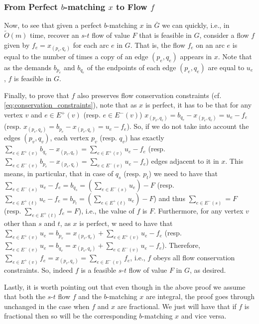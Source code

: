 \documentclass[11pt, letterpaper]{article}
\newcommand{\tO}[1]{\widetilde{O}(#1)}
\newcommand{\oG}{\bar{G}}
\newcommand{\bb}{\boldsymbol{\mathit{b}}}
\newcommand{\ff}{\boldsymbol{\mathit{f}}}
\newcommand{\xx}{\boldsymbol{\mathit{x}}}
\begin{document}
\subsubsection*{From Perfect $\bb$-matching $\xx$ to Flow $\ff$}

Now, to see that given a perfect $\bb$-matching $\xx$ in $\oG$ we can quickly, i.e., in $\tO{m}$ time, recover an $s$-$t$ flow of value $F$ that is feasible in $G$, consider a flow $\ff$ given by $f_e=x_{(p_e,q_e)}$ for each arc $e$ in $G$. That is, the flow $f_e$ on an arc $e$ is equal to the number of times a copy of an edge $(p_e,q_e)$ appears in $\xx$. Note that as the demands $b_{p_e}$ and $b_{q_e}$ of the endpoints of each edge $(p_e,q_e)$ are equal to $u_e$, $\ff$ is feasible in $G$.

Finally, to prove that $\ff$ also preserves flow conservation constraints (cf. \eqref{eq:conservation_constraints}), note that as $\xx$ is perfect, it has to be that for any vertex $v$ and $e\in E^+(v)$ (resp. $e\in E^-(v)$) $x_{(p_v,q_e)}=b_{q_e}-x_{(p_e,q_e)} = u_e - f_e$ (resp. $x_{(p_e,q_v)}=b_{p_e}-x_{(p_e,q_e)} = u_e - f_e$). So, if we do not take into account the edges $(p_v,q_v)$, each vertex $p_v$ (resp. $q_v$) has exactly $\sum_{e\in E^+(v)} b_{q_e}-x_{(p_e,q_e)} = \sum_{e\in E^+(v)} u_e - f_e$ (resp. $\sum_{e\in E^{-}(v)} b_{p_e}-x_{(p_e,q_e)} = \sum_{e\in E^{-}(v)} u_e - f_e$) edges adjacent to it in $\xx$. This means, in particular, that in case of $q_s$ (resp. $p_t$) we need to have that $\sum_{e\in E^{-}(s)} u_e-f_e = b_{q_s} = (\sum_{e\in E^{-}(s)} u_e) - F$ (resp. $\sum_{e\in E^{+}(t)} u_e-f_e = b_{p_t} = (\sum_{e\in E^{+}(t)} u_e) - F$) and thus $\sum_{e\in E^{-}(s)}=F$ (resp. $\sum_{e\in E^{+}(t)} f_e=F$), i.e., the value of $\ff$ is $F$. Furthermore, for any vertex $v$ other than $s$ and $t$, as $\xx$ is perfect,  w need to have that $\sum_{e\in E^+(v)} u_e = b_{p_v}=x_{(p_v,q_v)}+\sum_{e\in E^+(v)} u_e - f_e$ (resp. $\sum_{e\in E^-(v)} u_e=b_{q_v}=x_{(p_v,q_v)}+\sum_{e\in E^-(v)} u_e - f_e$). Therefore, $\sum_{e\in E^+(v)} f_e = x_{(p_v,q_v)} = \sum_{e\in E^-(v)} f_e$, i.e., $\ff$ obeys all flow conservation constraints. So, indeed $\ff$ is a feasible $s$-$t$ flow of value $F$ in $G$, as desired.

Lastly, it is worth pointing out that even though in the above proof we assume that both the $s$-$t$ flow $\ff$ and the $\bb$-matching $\xx$ are integral, the proof goes through unchanged in the case when $\ff$ and $\xx$ are fractional. We just will have that if $\ff$ is fractional then so will be the corresponding $\bb$-matching $\xx$ and vice versa. 
\end{document}
